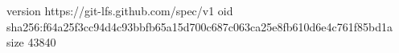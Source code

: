 version https://git-lfs.github.com/spec/v1
oid sha256:f64a25f3cc94d4c93bbfb65a15d700c687c063ca25e8fb610d6e4c761f85bd1a
size 43840

